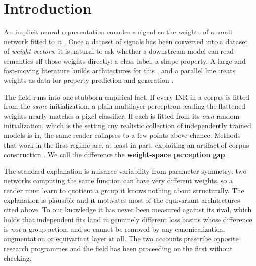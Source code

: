 \documentclass[10pt,twocolumn,letterpaper]{article}
\theoremstyle{definition}
\begin{document}
\section{Introduction}

An implicit neural representation encodes a signal as the weights of a small network fitted to
it \citep{sitzmann2020siren,mildenhall2020nerf,tancik2020fourier}. Once a dataset of signals has
been converted into a dataset of \emph{weight vectors}, it is natural to ask whether a downstream
model can read semantics off those weights directly: a class label, a shape property. A large and
fast-moving literature builds architectures for this
\citep{navon2023dws,zhou2023nfn,zhou2023nft,lim2024gmn,kofinas2024graph,tran2024monomial,%
zhou2024unf,kalogeropoulos2024scalegmn,schurholt2024sane}, and a parallel line treats weights as
data for property prediction and generation
\citep{unterthiner2020predicting,schurholt2021hyperrep,schurholt2022zoos,erkoc2023hyperdiffusion,%
peebles2022gpt}.

The field runs into one stubborn empirical fact. If every INR in a corpus is fitted from the
\emph{same} initialization, a plain multilayer perceptron reading the flattened weights nearly
matches a pixel classifier. If each is fitted from its \emph{own} random
initialization, which is the setting any realistic collection of independently trained models is
in, the same reader collapses to a few points above chance. Methods that work in the first regime are, at least in
part, exploiting an artifact of corpus construction
\citep{deluigi2023inr2vec,papa2024howtotrain}. We call the difference the \textbf{weight-space
perception gap}.

The standard explanation is nuisance variability from parameter symmetry: two networks computing
the same function can have very different weights, so a reader must learn to quotient a group it
knows nothing about structurally. The explanation is plausible and it motivates most of the
equivariant architectures cited above. To our knowledge it has never been measured against its
rival, which holds that independent fits land in genuinely different loss basins whose difference
is \emph{not} a group action, and so cannot be removed by any canonicalization, augmentation or
equivariant layer at all. The two accounts prescribe opposite research programmes and the field has
been proceeding on the first without checking.
\end{document}
